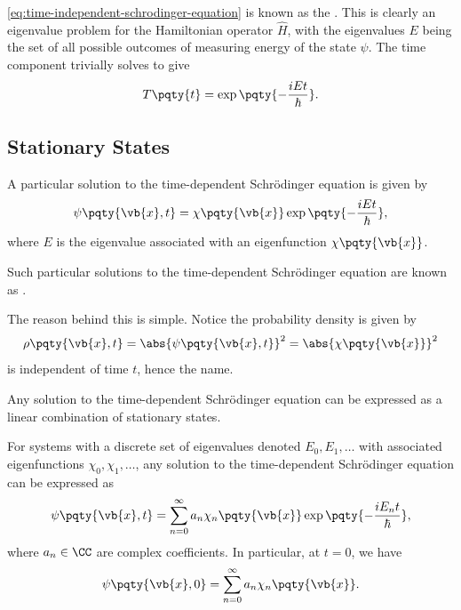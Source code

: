 \eqref{eq:time-independent-schrodinger-equation} is known as the . This is clearly an eigenvalue problem for the Hamiltonian operator \(\hat{H}\), with the eigenvalues \(E\) being the set of all possible outcomes of measuring energy of the state \(\psi\). The time component trivially solves to give
\begin{equation}
    T\pqty{t} = \exp\pqty{- \frac{i E t}{\hbar}}.
\end{equation}

\subsection{Stationary States}

A particular solution to the time-dependent Schr\"odinger equation is given by
\begin{equation}
    \psi\pqty{\vb{x}, t} = \chi\pqty{\vb{x}} \exp\pqty{- \frac{i E t}{\hbar}},
\end{equation}
where \(E\) is the eigenvalue associated with an eigenfunction \(\chi\pqty{\vb{x}}\).

\begin{definition}
    Such particular solutions to the time-dependent Schr\"odinger equation are known as .
\end{definition}

The reason behind this is simple. Notice the probability density is given by
\begin{equation}
    \rho\pqty{\vb{x}, t} = \abs{\psi\pqty{\vb{x}, t}}^2 = \abs{\chi\pqty{\vb{x}}}^2
\end{equation}
is independent of time \(t\), hence the name.

\begin{theorem}
    Any solution to the time-dependent Schr\"odinger equation can be expressed as a linear combination of stationary states.
\end{theorem}

For systems with a discrete set of eigenvalues denoted \(E_0, E_1, \ldots\) with associated eigenfunctions \(\chi_0, \chi_1, \ldots\), any solution to the time-dependent Schr\"odinger equation can be expressed as
\begin{equation}
    \psi\pqty{\vb{x}, t} = \sum_{n = 0}^{\infty} a_n \chi_n\pqty{\vb{x}} \exp\pqty{- \frac{i E_n t}{\hbar}},
\end{equation}
where \(a_n \in \CC\) are complex coefficients. In particular, at \(t = 0\), we have
\begin{equation}
    \psi\pqty{\vb{x}, 0} = \sum_{n = 0}^{\infty} a_n \chi_n\pqty{\vb{x}}.
\end{equation}

